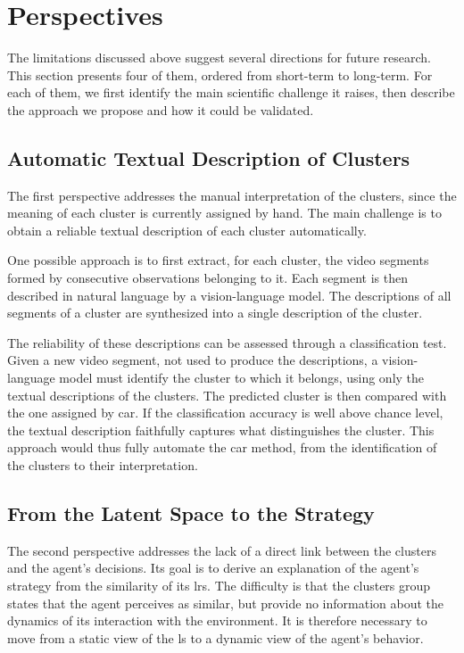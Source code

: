 \section{Perspectives}
\label{sec:conclusion_perspectives}

The limitations discussed above suggest several directions for future research.
This section presents four of them, ordered from short-term to long-term.
For each of them, we first identify the main scientific challenge it raises, then describe the approach we propose and how it could be validated.

\subsection{Automatic Textual Description of Clusters}
\label{subsec:conclusion_perspectives_textual_description}

The first perspective addresses the manual interpretation of the clusters, since the meaning of each cluster is currently assigned by hand.
The main challenge is to obtain a reliable textual description of each cluster automatically.

One possible approach is to first extract, for each cluster, the video segments formed by consecutive observations belonging to it.
Each segment is then described in natural language by a vision-language model.
The descriptions of all segments of a cluster are synthesized into a single description of the cluster.

The reliability of these descriptions can be assessed through a classification test.
Given a new video segment, not used to produce the descriptions, a vision-language model must identify the cluster to which it belongs, using only the textual descriptions of the clusters.
The predicted cluster is then compared with the one assigned by \gls{car}.
If the classification accuracy is well above chance level, the textual description faithfully captures what distinguishes the cluster.
This approach would thus fully automate the \gls{car} method, from the identification of the clusters to their interpretation.

\subsection{From the Latent Space to the Strategy}
\label{subsec:conclusion_perspectives_strategy}

The second perspective addresses the lack of a direct link between the clusters and the agent's decisions.
Its goal is to derive an explanation of the agent's strategy from the similarity of its \glspl{lr}.
The difficulty is that the clusters group states that the agent perceives as similar, but provide no information about the dynamics of its interaction with the environment.
It is therefore necessary to move from a static view of the \gls{ls} to a dynamic view of the agent's behavior.

